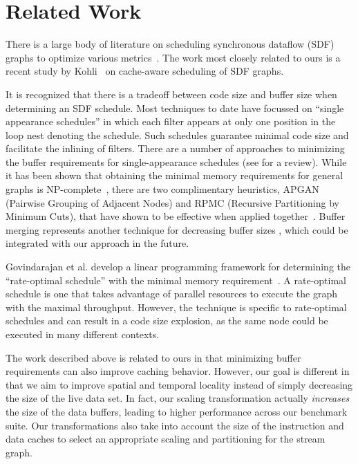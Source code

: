 \section{Related Work}
\label{sec:related-work}

There is a large body of literature on scheduling synchronous dataflow
(SDF) graphs to optimize various
metrics~\cite{bhattacharyya99synthesis,leesdf}.  The work most closely
related to ours is a recent study by Kohli~\cite{kohli04} on cache-aware
scheduling of SDF graphs.

It is recognized that there is a tradeoff between code size and buffer
size when determining an SDF schedule.  Most techniques to date have
focussed on ``single appearance schedules'' in which each filter
appears at only one position in the loop nest denoting the schedule.
Such schedules guarantee minimal code size and facilitate the inlining
of filters.  There are a number of approaches to minimizing the buffer
requirements for single-appearance schedules (see
\cite{bhattacharyya99synthesis} for a review).  While it has been
shown that obtaining the minimal memory requirements for general
graphs is NP-complete~\cite{Bhatta97}, there are two complimentary
heuristics, APGAN (Pairwise Grouping of Adjacent Nodes) and RPMC
(Recursive Partitioning by Minimum Cuts), that have shown to be
effective when applied together~\cite{Bhatta97}.  Buffer
merging\cite{murt1999x3,murt2000x2} represents another technique for
decreasing buffer sizes , which could be integrated with our approach
in the future.

Govindarajan et al. develop a linear programming framework for
determining the ``rate-optimal schedule'' with the minimal memory
requirement~\cite{GGD94}.  A rate-optimal schedule is one that takes
advantage of parallel resources to execute the graph with the maximal
throughput.  However, the technique is specific to rate-optimal
schedules and can result in a code size explosion, as the same node
could be executed in many different contexts.

The work described above is related to ours in that minimizing buffer
requirements can also improve caching behavior.  However, our goal is
different in that we aim to improve spatial and temporal locality
instead of simply decreasing the size of the live data set.  In fact,
our scaling transformation actually {\it increases} the size of the
data buffers, leading to higher performance across our benchmark
suite.  Our transformations also take into account the size of the
instruction and data caches to select an appropriate scaling and
partitioning for the stream graph.

